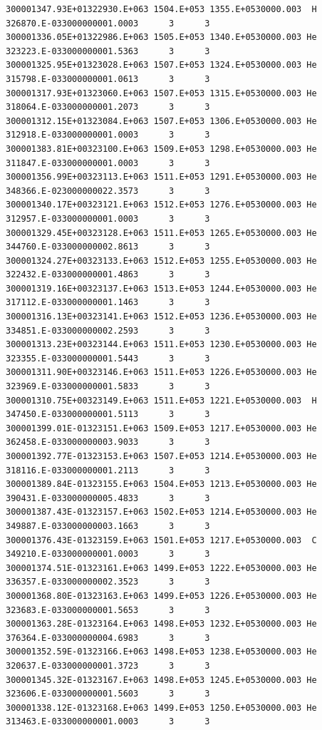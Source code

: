 \documentclass [11pt,a4paper,dvipdfmx] {jarticle}
\begin{document}
\begin{lstlisting}[caption={COLLISION.txtの例。1イベントのみ抽出。},basicstyle=\fontsize{6}{6}\ttfamily,identifierstyle=\fontsize{6}{6},numberstyle={\tiny},columns=fixed]
300001347.93E+01322930.E+063 1504.E+053 1355.E+0530000.003  H 326870.E-033000000001.0003      3      3
300001336.05E+01322986.E+063 1505.E+053 1340.E+0530000.003 He 323223.E-033000000001.5363      3      3
300001325.95E+01323028.E+063 1507.E+053 1324.E+0530000.003 He 315798.E-033000000001.0613      3      3
300001317.93E+01323060.E+063 1507.E+053 1315.E+0530000.003 He 318064.E-033000000001.2073      3      3
300001312.15E+01323084.E+063 1507.E+053 1306.E+0530000.003 He 312918.E-033000000001.0003      3      3
300001383.81E+00323100.E+063 1509.E+053 1298.E+0530000.003 He 311847.E-033000000001.0003      3      3
300001356.99E+00323113.E+063 1511.E+053 1291.E+0530000.003 He 348366.E-023000000022.3573      3      3
300001340.17E+00323121.E+063 1512.E+053 1276.E+0530000.003 He 312957.E-033000000001.0003      3      3
300001329.45E+00323128.E+063 1511.E+053 1265.E+0530000.003 He 344760.E-033000000002.8613      3      3
300001324.27E+00323133.E+063 1512.E+053 1255.E+0530000.003 He 322432.E-033000000001.4863      3      3
300001319.16E+00323137.E+063 1513.E+053 1244.E+0530000.003 He 317112.E-033000000001.1463      3      3
300001316.13E+00323141.E+063 1512.E+053 1236.E+0530000.003 He 334851.E-033000000002.2593      3      3
300001313.23E+00323144.E+063 1511.E+053 1230.E+0530000.003 He 323355.E-033000000001.5443      3      3
300001311.90E+00323146.E+063 1511.E+053 1226.E+0530000.003 He 323969.E-033000000001.5833      3      3
300001310.75E+00323149.E+063 1511.E+053 1221.E+0530000.003  H 347450.E-033000000001.5113      3      3
300001399.01E-01323151.E+063 1509.E+053 1217.E+0530000.003 He 362458.E-033000000003.9033      3      3
300001392.77E-01323153.E+063 1507.E+053 1214.E+0530000.003 He 318116.E-033000000001.2113      3      3
300001389.84E-01323155.E+063 1504.E+053 1213.E+0530000.003 He 390431.E-033000000005.4833      3      3
300001387.43E-01323157.E+063 1502.E+053 1214.E+0530000.003 He 349887.E-033000000003.1663      3      3
300001376.43E-01323159.E+063 1501.E+053 1217.E+0530000.003  C 349210.E-033000000001.0003      3      3
300001374.51E-01323161.E+063 1499.E+053 1222.E+0530000.003 He 336357.E-033000000002.3523      3      3
300001368.80E-01323163.E+063 1499.E+053 1226.E+0530000.003 He 323683.E-033000000001.5653      3      3
300001363.28E-01323164.E+063 1498.E+053 1232.E+0530000.003 He 376364.E-033000000004.6983      3      3
300001352.59E-01323166.E+063 1498.E+053 1238.E+0530000.003 He 320637.E-033000000001.3723      3      3
300001345.32E-01323167.E+063 1498.E+053 1245.E+0530000.003 He 323606.E-033000000001.5603      3      3
300001338.12E-01323168.E+063 1499.E+053 1250.E+0530000.003 He 313463.E-033000000001.0003      3      3

\end{lstlisting}
\end{document}
